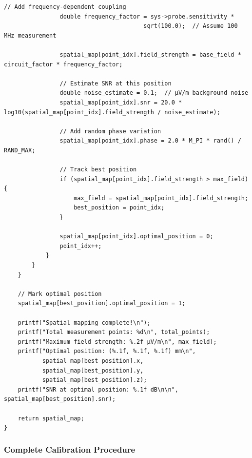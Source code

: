 \documentclass[11pt,a4paper]{article}
\theoremstyle{definition}
\begin{document}
\begin{lstlisting}[caption={Spatial EM Field Mapping}]
                // Add frequency-dependent coupling
                double frequency_factor = sys->probe.sensitivity * 
                                        sqrt(100.0);  // Assume 100 MHz measurement
                
                spatial_map[point_idx].field_strength = base_field * circuit_factor * frequency_factor;
                
                // Estimate SNR at this position
                double noise_estimate = 0.1;  // μV/m background noise
                spatial_map[point_idx].snr = 20.0 * log10(spatial_map[point_idx].field_strength / noise_estimate);
                
                // Add random phase variation
                spatial_map[point_idx].phase = 2.0 * M_PI * rand() / RAND_MAX;
                
                // Track best position
                if (spatial_map[point_idx].field_strength > max_field) {
                    max_field = spatial_map[point_idx].field_strength;
                    best_position = point_idx;
                }
                
                spatial_map[point_idx].optimal_position = 0;
                point_idx++;
            }
        }
    }
    
    // Mark optimal position
    spatial_map[best_position].optimal_position = 1;
    
    printf("Spatial mapping complete!\n");
    printf("Total measurement points: %d\n", total_points);
    printf("Maximum field strength: %.2f μV/m\n", max_field);
    printf("Optimal position: (%.1f, %.1f, %.1f) mm\n", 
           spatial_map[best_position].x, 
           spatial_map[best_position].y, 
           spatial_map[best_position].z);
    printf("SNR at optimal position: %.1f dB\n\n", spatial_map[best_position].snr);
    
    return spatial_map;
}
\end{lstlisting}

\subsubsection{Complete Calibration Procedure}
\end{document}
